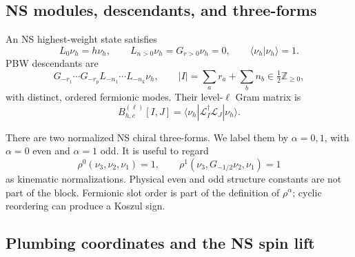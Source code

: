 \documentclass[11pt]{article}
\newcommand{\half}{\tfrac12}
\begin{document}
\subsection{NS modules, descendants, and three-forms}

An NS highest-weight state satisfies
\begin{equation}
 L_0\nu_h=h\nu_h,
 \qquad
 L_{n>0}\nu_h=G_{r>0}\nu_h=0,
 \qquad
 \langle\nu_h|\nu_h\rangle=1.
 \label{eq:highest-weight}
\end{equation}
PBW descendants are
\begin{equation}
 G_{-r_1}\cdots G_{-r_p}
 L_{-n_1}\cdots L_{-n_k}\nu_h,
 \qquad
 |I|=\sum_a r_a+\sum_b n_b
 \in\half\mathbb Z_{\ge0},
 \label{eq:pbw-descendants}
\end{equation}
with distinct, ordered fermionic modes.  Their level-\(\ell\) Gram matrix is
\begin{equation}
 B_{h,c}^{(\ell)}[I,J]
 =\langle\nu_h|\mathcal L_I^\dagger\mathcal L_J|\nu_h\rangle.
 \label{eq:gram-definition}
\end{equation}

There are two normalized NS chiral three-forms.  We label them by
\(\alpha=0,1\), with \(\alpha=0\) even and \(\alpha=1\) odd.  It is useful
to regard
\begin{equation}
 \rho^0(\nu_3,\nu_2,\nu_1)=1,
 \qquad
 \rho^1(\nu_3,G_{-1/2}\nu_2,\nu_1)=1
 \label{eq:three-form-normalization}
\end{equation}
as kinematic normalizations.  Physical even and odd structure constants are
not part of the block.  Fermionic slot order is part of the definition of
\(\rho^\alpha\); cyclic reordering can produce a Koszul sign.

\subsection{Plumbing coordinates and the NS spin lift}
\label{sec:block-definition}
\end{document}
